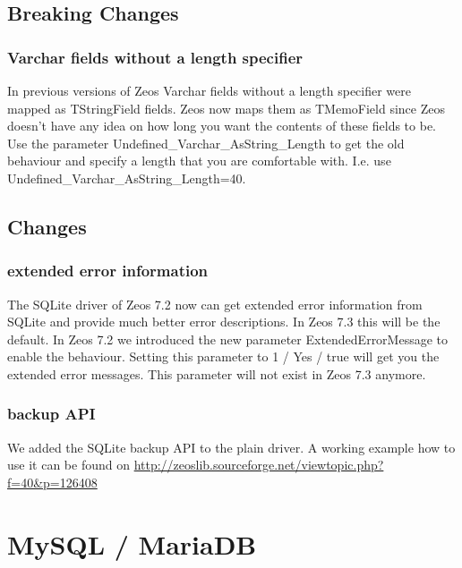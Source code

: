 \documentclass[a4paper,12pt,oneside]{book}
\begin{document}
\subsection{Breaking Changes}
\label{sec:Rev6_SQLite_BreakingChanges}

\subsubsection{Varchar fields without a length specifier}
\label{sec:Rev6_SQLite_BreakingChanges_VarcharWithoutLength}

In previous versions of Zeos Varchar fields without a length specifier were mapped as TStringField fields.
Zeos now maps them as TMemoField since Zeos doesn't have any idea on how long you want the contents of these fields to be.
Use the parameter Undefined\_Varchar\_AsString\_Length to get the old behaviour and specify a length that you are comfortable with.
I.e. use Undefined\_Varchar\_AsString\_Length=40.


\subsection{Changes}
\label{sec:Rev6_SQLite_Changes}

\subsubsection{extended error information}
\label{sec:Rev6_SQLite_Changes_ExtendedErrorInfo}
The SQLite driver of Zeos 7.2 now can get extended error information from SQLite and provide much better error descriptions.
In Zeos 7.3 this will be the default.
In Zeos 7.2 we introduced the new parameter ExtendedErrorMessage to enable the behaviour.
Setting this parameter to 1 / Yes / true will get you the extended error messages.
This parameter will not exist in Zeos 7.3 anymore.

\subsubsection{backup API}
\label{sec:Rev6_SQLite_Changes_BackupApi}

We added the SQLite backup API to the plain driver.
A working example how to use it can be found on \url{http://zeoslib.sourceforge.net/viewtopic.php?f=40&p=126408}

\section{MySQL / MariaDB}
\label{sec:Rev6_MysqlMariadb}
\end{document}
